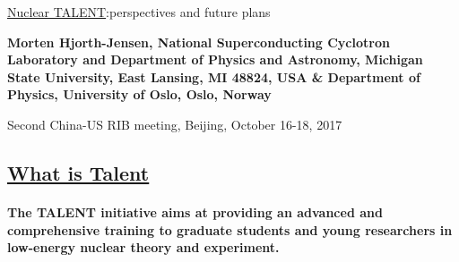 \documentclass[%
oneside,                 %
final,                   %
10pt]{article}
\begin{document}

\newcommand{\exercisesection}[1]{\subsection*{#1}}






\thispagestyle{empty}

\begin{center}
{\LARGE\bf
\begin{spacing}{1.25}
\href{{http://www.nucleartalent.org}}{Nuclear TALENT}:perspectives and future plans
\end{spacing}
}
\end{center}


\begin{center}
{\bf Morten Hjorth-Jensen, National Superconducting Cyclotron Laboratory and Department of Physics and Astronomy, Michigan State University, East Lansing, MI 48824, USA {\&} Department of Physics, University of Oslo, Oslo, Norway${}^{}$} \\ [0mm]
\end{center}

\begin{center}
\end{center}
    

\begin{center}
Second China-US RIB meeting, Beijing, October 16-18, 2017
\end{center}

\vspace{1cm}


\subsection{\href{{http://www.nucleartalent.org}}{What is Talent}}

\paragraph{}
\textbf{The TALENT initiative aims at providing an advanced and comprehensive training to graduate students and young researchers in low-energy nuclear theory and experiment.}
\end{document}
